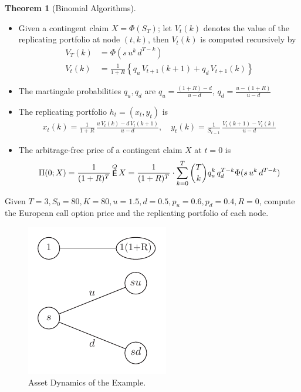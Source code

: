 \documentclass[10pt,handout]{beamer}
\newcommand{\ds}{\displaystyle}
\DeclareMathOperator\expc{{\sf E}}
\theoremstyle{definition}
\newtheorem*{thm}{Theorem}
\begin{document}
\begin{frame}
  \begin{thm}[Binomial Algorithms]
    \begin{itemize}
      \item Given a contingent claim $X=\Phi(S_T)$; let $V_t(k)$ denotes the value of the replicating portfolio at node $(t, k)$, then $V_t(k)$ is computed recursively by 
        \begin{align*}
          V_T(k) &= \Phi(s\,u^k\,d^{T-k}) \\
          V_t(k) &= \frac{1}{1+R}\left\{q_u\,V_{t+1}(k+1) + q_d\,V_{t+1}(k)\right\}
        \end{align*}
      \item The martingale probabilities $q_u, q_d$ are $\ds q_u = \frac{(1+R)-d}{u-d}$, $\ds q_d = \frac{u-(1+R)}{u-d}$
      \item The replicating portfolio $h_t = (x_t, y_t)$ is \vspace{-3mm}
        \begin{align*}
          x_t(k) = \frac{1}{1+R}\,\frac{u\,V_t(k)-d\,V_t(k+1)}{u-d}, \quad y_t(k) = \frac{1}{S_{t-1}}\,\frac{V_t(k+1)-V_t(k)}{u-d}
        \end{align*}
      \item The arbitrage-free price of a contingent claim $X$ at $t=0$ is \vspace{-3mm} 
    \begin{align*}
      \Pi(0;X) = \frac{1}{(1 + R)^T}\expc^Q X = \frac{1}{(1 + R)^T}\cdot\sum_{k=0}^T\binom{T}{k}q_u^k\,q_d^{T-k}\Phi(s\,u^k\,d^{T-k})
    \end{align*}
    \end{itemize}
  \end{thm}
\end{frame}

\begin{frame}
  \begin{example}
    Given $T=3, S_0=80, K=80, u=1.5, d=0.5, p_u=0.6, p_d=0.4, R=0$, compute the European call option price and the replicating portfolio of each node.
  \end{example}
  \begin{figure}
    \centering
    \includegraphics[scale=.9,page=4]{fig/note08/bjork.pdf}
    \caption{Asset Dynamics of the Example.}
  \end{figure}  
\end{frame}
\end{document}
